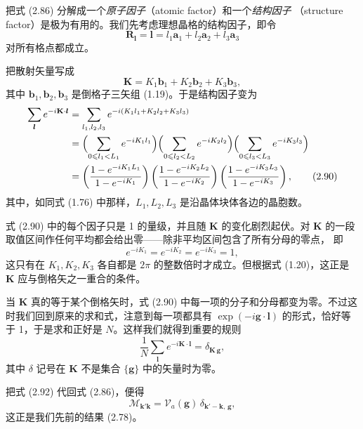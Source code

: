 把式 (2.86) 分解成一个\emph{原子因子}（atomic factor）和一个\emph{结构因子}
（structure factor）是极为有用的。我们先考虑理想晶格的结构因子，即令
\begin{equation*}
\mathbf{R}_{\boldsymbol{l}} = \boldsymbol{l}
= l_1\mathbf{a}_1 + l_2\mathbf{a}_2 + l_3\mathbf{a}_3
\tag{2.88}
\end{equation*}
对所有格点都成立。

把散射矢量写成
\begin{equation*}
\mathbf{K} = K_1\mathbf{b}_1 + K_2\mathbf{b}_2 + K_3\mathbf{b}_3,
\tag{2.89}
\end{equation*}
其中 $\mathbf{b}_1, \mathbf{b}_2, \mathbf{b}_3$
是倒格子三矢组 (1.19)。于是结构因子变为
\begin{align*}
\sum_{\boldsymbol{l}} e^{-i\mathbf{K}\cdot\boldsymbol{l}}
&= \sum_{l_1,l_2,l_3} e^{-i(K_1 l_1 + K_2 l_2 + K_3 l_3)} \\
&= \Bigl( \sum_{0 \leqslant l_1 < L_1} e^{-iK_1 l_1} \Bigr)
   \Bigl( \sum_{0 \leqslant l_2 < L_2} e^{-iK_2 l_2} \Bigr)
   \Bigl( \sum_{0 \leqslant l_3 < L_3} e^{-iK_3 l_3} \Bigr) \\
&= \left( \frac{1 - e^{-iK_1 L_1}}{1 - e^{-iK_1}} \right)
   \left( \frac{1 - e^{-iK_2 L_2}}{1 - e^{-iK_2}} \right)
   \left( \frac{1 - e^{-iK_3 L_3}}{1 - e^{-iK_3}} \right),
\tag{2.90}
\end{align*}
其中，如同式 (1.76) 中那样，$L_1, L_2, L_3$
是沿晶体块体各边的晶胞数。

式 (2.90) 中的每个因子只是 1 的量级，并且随 $\mathbf{K}$ 的变化剧烈起伏。对
$\mathbf{K}$ 的一段取值区间作任何平均都会给出零——除非平均区间包含了所有分母的零点，
即
\begin{equation*}
e^{-iK_1} = e^{-iK_2} = e^{-iK_3} = 1,
\tag{2.91}
\end{equation*}
这只有在 $K_1, K_2, K_3$ 各自都是 $2\pi$
的整数倍时才成立。但根据式 (1.20)，这正是 $\mathbf{K}$
应与倒格矢之一重合的条件。

当 $\mathbf{K}$ 真的等于某个倒格矢时，式 (2.90)
中每一项的分子和分母都变为零。不过这时我们回到原来的求和式，注意到每一项都具有
$\exp(-i\mathbf{g}\cdot\boldsymbol{l})$ 的形式，恰好等于 1，于是求和正好是
$N$。这样我们就得到重要的规则
\begin{equation*}
\frac{1}{N} \sum_{\boldsymbol{l}} e^{-i\mathbf{K}\cdot\boldsymbol{l}}
= \delta_{\mathbf{K}\,\mathbf{g}},
\tag{2.92}
\end{equation*}
其中 $\delta$ 记号在 $\mathbf{K}$ 不是集合 $\{\mathbf{g}\}$
中的矢量时为零。

把式 (2.92) 代回式 (2.86)，便得
\begin{equation*}
\mathcal{M}_{\mathbf{k}'\mathbf{k}}
= \mathcal{V}_a(\mathbf{g})\, \delta_{\mathbf{k}'-\mathbf{k},\,\mathbf{g}},
\tag{2.93}
\end{equation*}
这正是我们先前的结果 (2.78)。

